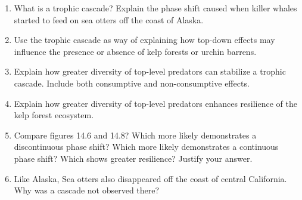 \documentclass[letterpaper]{tufte-handout}
\begin{document}
\begin{enumerate}
\item
  What is a trophic cascade? Explain the phase shift caused when killer whales started to feed on sea otters off the coast of Alaska. 
    
\item Use the trophic cascade as way of explaining how top-down effects may influence the presence or absence of kelp forests or urchin barrens.

\item Explain how greater diversity of top-level predators can stabilize a trophic cascade. Include both consumptive and non-consumptive effects.

\item Explain how greater diversity of top-level predators enhances resilience of the kelp forest ecosystem.

\item Compare figures 14.6 and 14.8? Which more likely demonstrates a discontinuous phase shift? Which more likely demonstrates a continuous phase shift? Which shows greater resilience? Justify your answer.

\item Like Alaska, Sea otters also disappeared off the coast of central California. Why was a cascade not observed there?

\end{enumerate}
\end{document}
